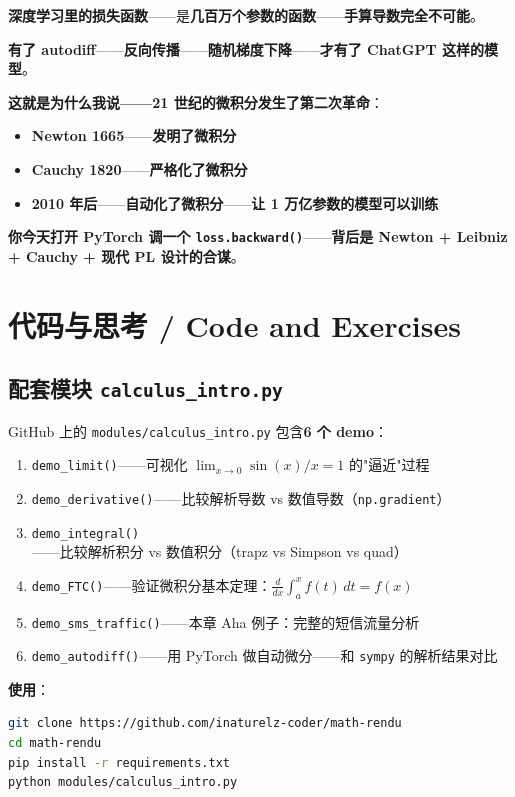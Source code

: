 \textbf{深度学习里的损失函数}——是\textbf{几百万个参数的函数}——\textbf{手算导数完全不可能}。

\textbf{有了 autodiff}——\textbf{反向传播}——\textbf{随机梯度下降}——\textbf{才有了 ChatGPT 这样的模型}。

\textbf{这就是为什么我说——21 世纪的微积分发生了第二次革命}：

\begin{itemize}
\item \textbf{Newton 1665}——\textbf{发明了微积分}
\item \textbf{Cauchy 1820}——\textbf{严格化了微积分}
\item \textbf{2010 年后}——\textbf{自动化了微积分}——\textbf{让 1 万亿参数的模型可以训练}
\end{itemize}

\textbf{你今天打开 PyTorch 调一个 \texttt{loss.backward()}}——\textbf{背后是 Newton + Leibniz + Cauchy + 现代 PL 设计的合谋}。

\section{代码与思考 / Code and Exercises}

\subsection{配套模块 \texttt{calculus\_intro.py}}

GitHub 上的 \texttt{modules/calculus\_intro.py} 包含\textbf{6 个 demo}：

\begin{enumerate}
\item \texttt{demo\_limit()}——可视化 $\lim_{x\to 0} \sin(x)/x = 1$ 的"逼近"过程
\item \texttt{demo\_derivative()}——比较解析导数 vs 数值导数（\texttt{np.gradient}）
\item \texttt{demo\_integral()}——比较解析积分 vs 数值积分（trapz vs Simpson vs quad）
\item \texttt{demo\_FTC()}——验证微积分基本定理：$\frac{d}{dx}\int_a^x f(t)\,dt = f(x)$
\item \texttt{demo\_sms\_traffic()}——本章 Aha 例子：完整的短信流量分析
\item \texttt{demo\_autodiff()}——用 PyTorch 做自动微分——和 \texttt{sympy} 的解析结果对比
\end{enumerate}

\textbf{使用}：

\begin{lstlisting}[language=bash]
git clone https://github.com/inaturelz-coder/math-rendu
cd math-rendu
pip install -r requirements.txt
python modules/calculus_intro.py
\end{lstlisting}

